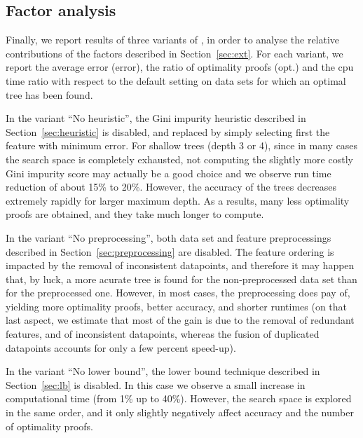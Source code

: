 \documentclass{llncs}
\begin{document}
%

\subsection{Factor analysis}

Finally, we report results of three variants of \budalg, in order to analyse the relative contributions of the factors described in Section~\ref{sec:ext}. For each variant, we report the average error (error), the ratio of optimality proofs (opt.) and the cpu time ratio with respect to the default setting on data sets for which an optimal tree has been found.

In the variant ``No heuristic'', the Gini impurity heuristic described in Section~\ref{sec:heuristic} is disabled, and replaced by simply selecting first the feature with minimum error. For shallow trees (depth 3 or 4), since in many cases the search space is completely exhausted, not computing the slightly more costly Gini impurity score may actually be a good choice and we observe run time reduction of about 15\% to 20\%. However, the accuracy of the trees decreases extremely rapidly for larger maximum depth. As a results, many less optimality proofs are obtained, and they take much longer to compute.

In the variant ``No preprocessing'', both data set and feature preprocessings described in Section~\ref{sec:preprocessing} are disabled. The feature ordering is impacted by the removal of inconsistent datapoints, and therefore it may happen that, by luck, a more acurate tree is found for the non-preprocessed data set than for the preprocessed one. However, in most cases, the preprocessing does pay of, yielding more optimality proofs, better accuracy, and shorter runtimes (on that last aspect, we estimate that most of the gain is due to the removal of redundant features, and of inconsistent datapoints, whereas the fusion of duplicated datapoints accounts for only a few percent speed-up).

In the variant ``No lower bound'', the lower bound technique described in Section~\ref{sec:lb} is disabled. In this case we observe a small increase in computational time (from 1\% up to 40\%). However, the search space is explored in the same order, and it only slightly negatively affect accuracy and the number of optimality proofs.
\end{document}
